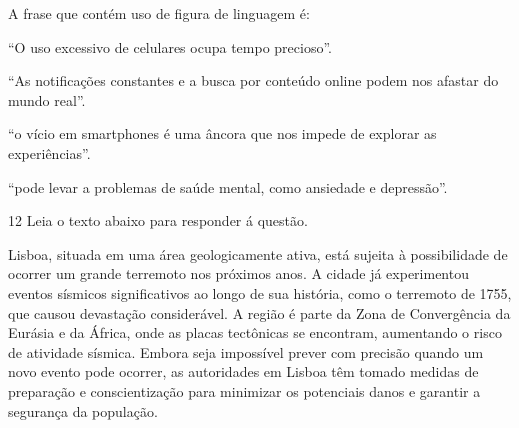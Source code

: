 


A frase que contém uso de figura de linguagem é:

\begin{escolha}
    
    \item ``O uso excessivo de celulares ocupa tempo precioso''.
    
    \item ``As notificações constantes e a busca por conteúdo online podem nos afastar do mundo real''.
    
    \item ``o vício em smartphones é uma âncora que nos impede de explorar as experiências''.
    
    \item ``pode levar a problemas de saúde mental, como ansiedade e depressão''.

\end{escolha}

\num{12} Leia o texto abaixo para responder á questão.

\begin{myquote}

Lisboa, situada em uma área geologicamente ativa, está sujeita à possibilidade
de ocorrer um grande terremoto nos próximos anos. A cidade já experimentou
eventos sísmicos significativos ao longo de sua história, como o terremoto de
1755, que causou devastação considerável. A região é parte da Zona de
Convergência da Eurásia e da África, onde as placas tectônicas se encontram,
aumentando o risco de atividade sísmica. Embora seja impossível prever com
precisão quando um novo evento pode ocorrer, as autoridades em Lisboa têm
tomado medidas de preparação e conscientização para minimizar os potenciais
danos e garantir a segurança da população.


\end{myquote}

